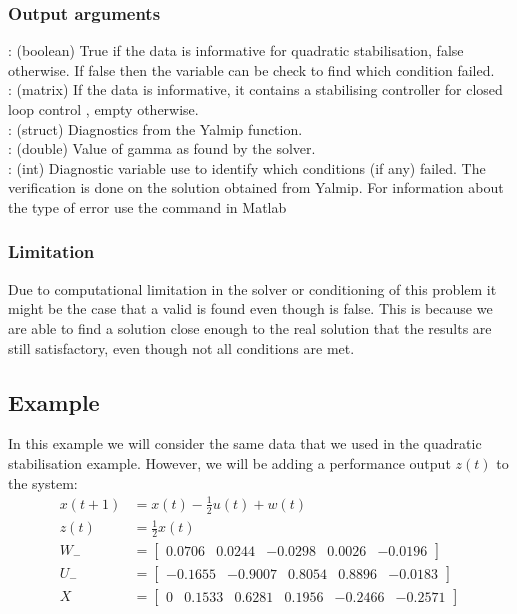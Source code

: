 \subsubsection*{Output arguments}
\textbf{}: (boolean) True if the data is informative for quadratic stabilisation, false otherwise. If false then the  variable can be check to find which condition failed. \\
\textbf{}: (matrix) If the data is informative, it contains a stabilising controller  for closed loop control , empty otherwise.\\
\textbf{}: (struct) Diagnostics from the Yalmip  function. \\
\textbf{}: (double) Value of gamma as found by the solver. \\
\textbf{}: (int) Diagnostic variable use to identify which conditions (if any) failed. The verification is done on the solution obtained from Yalmip. For information about the type of error use the  command in Matlab

\subsubsection*{Limitation}
Due to computational limitation in the solver or conditioning of this problem it might be the case that a valid  is found even though  is false. This is because we are able to find a solution close enough to the real solution that the results are still satisfactory, even though not all conditions are met. 

\subsection{Example} \label{ExampleH2}
In this example we will consider the same data that we used in the quadratic stabilisation example. However, we will be adding a performance output $z(t)$ to the system:
\begin{align*}
	x(t+1) &= x(t) - \frac{1}{2}u(t) + w(t) \\
	z(t)   &= \frac{1}{2}x(t) \\
	W_- &= \begin{bmatrix}  0.0706 &  0.0244 & -0.0298 & 0.0026 & -0.0196 \end{bmatrix} \\
	U_- &= \begin{bmatrix} -0.1655 & -0.9007 &  0.8054 & 0.8896 & -0.0183 \end{bmatrix} \\
	X   &= \begin{bmatrix}     0   &  0.1533 &  0.6281 & 0.1956 & -0.2466 & -0.2571 \end{bmatrix} \\
\end{align*}

